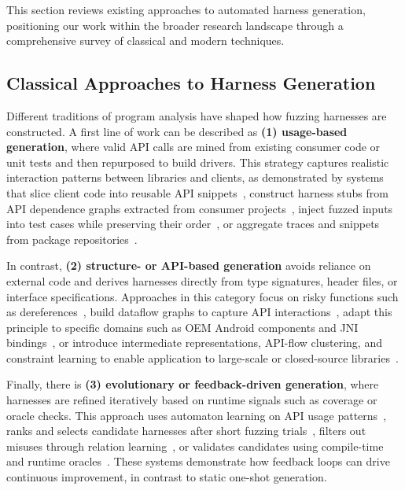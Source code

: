 \documentclass[sigconf,review,anonymous]{acmart}
\begin{document}
This section reviews existing approaches to automated harness generation, positioning our work within the broader research landscape through a comprehensive survey of classical and modern techniques.

\subsection{Classical Approaches to Harness Generation}
\label{subsec:classical-harness-generation}



Different traditions of program analysis have shaped how fuzzing harnesses are constructed. A first line of work can be described as \textbf{(1) usage-based generation}, where valid API calls are mined from existing consumer code or unit tests and then repurposed to build drivers. This strategy captures realistic interaction patterns between libraries and clients, as demonstrated by systems that slice client code into reusable API snippets~\cite{DBLP:conf/sigsoft/BabicBCIKKLSW19:FUDGE}, construct harness stubs from API dependence graphs extracted from consumer projects~\cite{DBLP:conf/uss/IspoglouAMP20:FuzzGen}, inject fuzzed inputs into test cases while preserving their order~\cite{DBLP:conf/sp/JeongJYMKJKSH23:UTopia}, or aggregate traces and snippets from package repositories~\cite{DBLP:journals/pacmse/WuNH25:WildSync, DBLP:conf/icse/ZhangZLWLZJ23:Daisy}.

In contrast, \textbf{(2) structure- or API-based generation} avoids reliance on external code and derives harnesses directly from type signatures, header files, or interface specifications. Approaches in this category focus on risky functions such as dereferences~\cite{DBLP:conf/icse:ZhangLMZ021:IntelliGen}, build dataflow graphs to capture API interactions~\cite{DBLP:conf/icse/GreenA22:GraphFuzz}, adapt this principle to specific domains such as OEM Android components and JNI bindings~\cite{DBLP:conf/ccs/ChenXLWC23:Hopper, DBLP:conf/uss/IspoglouAMP20:FuzzGen, DBLP:conf/issta/XiongDCQWSZ24:Atlas}, or introduce intermediate representations, API-flow clustering, and constraint learning to enable application to large-scale or closed-source libraries~\cite{DBLP:journals/pacmse/ToffaliniBTP25:LibErator, DBLP:conf/icse/ShermanN25:OGHarn, DBLP:conf/ndss/0007ZLSZLQ25:NEXZZER}.

Finally, there is \textbf{(3) evolutionary or feedback-driven generation}, where harnesses are refined iteratively based on runtime signals such as coverage or oracle checks. This approach uses automaton learning on API usage patterns~\cite{DBLP:conf/uss/ZhangLZZZZXLL0H23:Rubick}, ranks and selects candidate harnesses after short fuzzing trials~\cite{DBLP:journals/pacmse/ToffaliniBTP25:LibErator}, filters out misuses through relation learning~\cite{DBLP:conf/ndss/0007ZLSZLQ25:NEXZZER}, or validates candidates using compile-time and runtime oracles~\cite{DBLP:conf/icse/ShermanN25:OGHarn}. These systems demonstrate how feedback loops can drive continuous improvement, in contrast to static one-shot generation.
\end{document}
